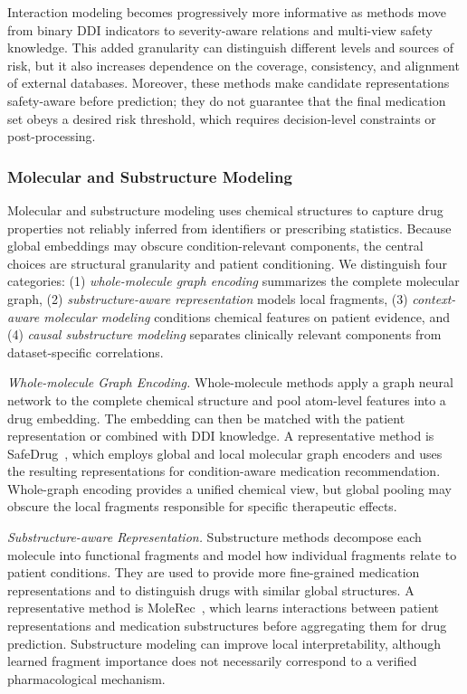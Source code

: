 \documentclass[manuscript,review]{acmart}
\begin{document}
Interaction modeling becomes progressively more informative as methods move from binary DDI indicators to severity-aware relations and multi-view safety knowledge. This added granularity can distinguish different levels and sources of risk, but it also increases dependence on the coverage, consistency, and alignment of external databases. Moreover, these methods make candidate representations safety-aware before prediction; they do not guarantee that the final medication set obeys a desired risk threshold, which requires decision-level constraints or post-processing.

\subsubsection{Molecular and Substructure Modeling}

Molecular and substructure modeling uses chemical structures to capture drug properties not reliably inferred from identifiers or prescribing statistics. Because global embeddings may obscure condition-relevant components, the central choices are structural granularity and patient conditioning. We distinguish four categories: (1) \textit{whole-molecule graph encoding} summarizes the complete molecular graph, (2) \textit{substructure-aware representation} models local fragments, (3) \textit{context-aware molecular modeling} conditions chemical features on patient evidence, and (4) \textit{causal substructure modeling} separates clinically relevant components from dataset-specific correlations.

\textit{Whole-molecule Graph Encoding.} Whole-molecule methods apply a graph neural network to the complete chemical structure and pool atom-level features into a drug embedding. The embedding can then be matched with the patient representation or combined with DDI knowledge. A representative method is SafeDrug~\cite{yang2021safedrug}, which employs global and local molecular graph encoders and uses the resulting representations for condition-aware medication recommendation. Whole-graph encoding provides a unified chemical view, but global pooling may obscure the local fragments responsible for specific therapeutic effects.

\textit{Substructure-aware Representation.} Substructure methods decompose each molecule into functional fragments and model how individual fragments relate to patient conditions. They are used to provide more fine-grained medication representations and to distinguish drugs with similar global structures. A representative method is MoleRec~\cite{yang2023molerec}, which learns interactions between patient representations and medication substructures before aggregating them for drug prediction. Substructure modeling can improve local interpretability, although learned fragment importance does not necessarily correspond to a verified pharmacological mechanism.
\end{document}
